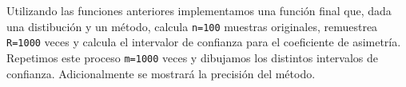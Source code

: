 \documentclass[a4paper]{article}
\begin{document}
\begin{Shaded}
\begin{Highlighting}[]
		\NormalTok{  \} } \OperatorTok{==}\NormalTok{) \{}
		\StringTok{ }\OperatorTok{/}\NormalTok{)}
		\StringTok{ }\OperatorTok{-}\OperatorTok{/}\NormalTok{)}
		\NormalTok{  \} }\NormalTok{ \{}
		\NormalTok{(}\NormalTok{)}
		\NormalTok{  \}}
		\NormalTok{\}}
	\end{Highlighting}
\end{Shaded}

Utilizando las funciones anteriores implementamos una función final que,
dada una distibución y un método, calcula \texttt{n=100} muestras
originales, remuestrea \texttt{R=1000} veces y calcula el intervalor de
confianza para el coeficiente de asimetría. Repetimos este proceso
\texttt{m=1000} veces y dibujamos los distintos intervalos de confianza.
Adicionalmente se mostrará la precisión del método.
\end{document}
